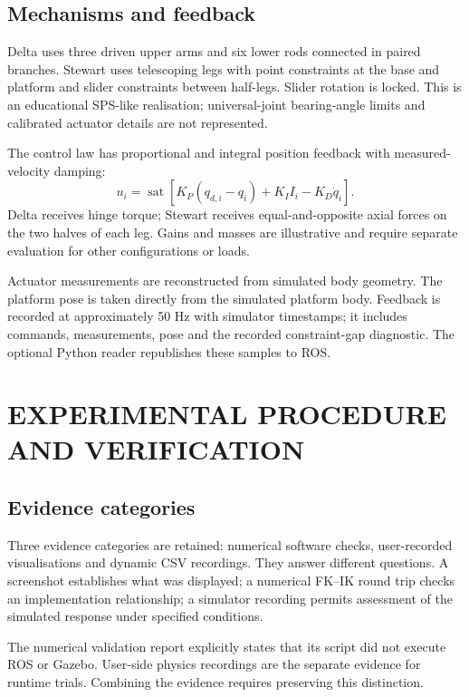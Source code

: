 \documentclass[11pt,a4paper,oneside]{report}
\begin{document}
\section{Mechanisms and feedback}
Delta uses three driven upper arms and six lower rods connected in paired branches. Stewart uses telescoping legs with point constraints at the base and platform and slider constraints between half-legs. Slider rotation is locked. This is an educational SPS-like realisation; universal-joint bearing-angle limits and calibrated actuator details are not represented.

The control law has proportional and integral position feedback with measured-velocity damping:
\begin{equation}
u_i=\operatorname{sat}\!\left[K_P(q_{d,i}-q_i)+K_I I_i-K_D\dot q_i\right].
\end{equation}
Delta receives hinge torque; Stewart receives equal-and-opposite axial forces on the two halves of each leg. Gains and masses are illustrative and require separate evaluation for other configurations or loads.

Actuator measurements are reconstructed from simulated body geometry. The platform pose is taken directly from the simulated platform body. Feedback is recorded at approximately 50 Hz with simulator timestamps; it includes commands, measurements, pose and the recorded constraint-gap diagnostic. The optional Python reader republishes these samples to ROS.

\chapter{EXPERIMENTAL PROCEDURE AND VERIFICATION}
\section{Evidence categories}
Three evidence categories are retained: numerical software checks, user-recorded visualisations and dynamic CSV recordings. They answer different questions. A screenshot establishes what was displayed; a numerical FK--IK round trip checks an implementation relationship; a simulator recording permits assessment of the simulated response under specified conditions.

The numerical validation report explicitly states that its script did not execute ROS or Gazebo. User-side physics recordings are the separate evidence for runtime trials. Combining the evidence requires preserving this distinction.
\end{document}
